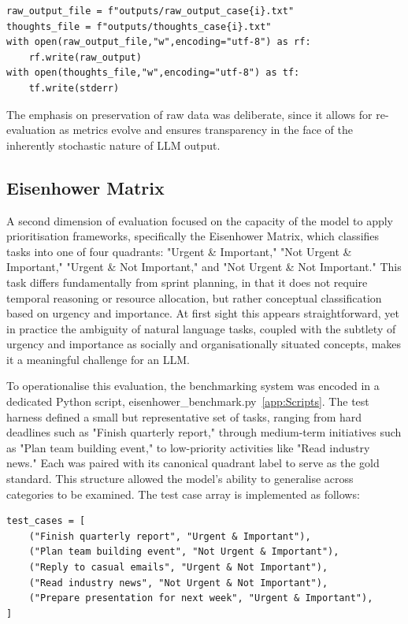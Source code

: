 \documentclass{report}
\begin{document}
\begin{lstlisting}[style=pythonstyle]
    raw_output_file = f"outputs/raw_output_case{i}.txt"
thoughts_file = f"outputs/thoughts_case{i}.txt"
with open(raw_output_file,"w",encoding="utf-8") as rf:
    rf.write(raw_output)
with open(thoughts_file,"w",encoding="utf-8") as tf:
    tf.write(stderr)

\end{lstlisting}

The emphasis on preservation of raw data was deliberate, since it allows for re-evaluation as metrics evolve and ensures transparency in the face of the inherently stochastic nature of LLM output.

\subsection{Eisenhower Matrix}

A second dimension of evaluation focused on the capacity of the model to apply prioritisation frameworks, specifically the Eisenhower Matrix, which classifies tasks into one of four quadrants: "Urgent \& Important," "Not Urgent \& Important," "Urgent \& Not Important," and "Not Urgent \& Not Important." 
This task differs fundamentally from sprint planning, in that it does not require temporal reasoning or resource allocation, but rather conceptual classification based on urgency and importance. 
At first sight this appears straightforward, yet in practice the ambiguity of natural language tasks, coupled with the subtlety of urgency and importance as socially and organisationally situated concepts, makes it a meaningful challenge for an LLM.

To operationalise this evaluation, the benchmarking system was encoded in a dedicated Python script, eisenhower\_benchmark.py~\ref{app:Scripts}. 
The test harness defined a small but representative set of tasks, ranging from hard deadlines such as "Finish quarterly report," through medium-term initiatives such as "Plan team building event," to low-priority activities like "Read industry news." 
Each was paired with its canonical quadrant label to serve as the gold standard. 
This structure allowed the model's ability to generalise across categories to be examined. 
The test case array is implemented as follows:

\begin{lstlisting}[style=pythonstyle]
test_cases = [
    ("Finish quarterly report", "Urgent & Important"),
    ("Plan team building event", "Not Urgent & Important"),
    ("Reply to casual emails", "Urgent & Not Important"),
    ("Read industry news", "Not Urgent & Not Important"),
    ("Prepare presentation for next week", "Urgent & Important"),
]

\end{lstlisting}
\end{document}

